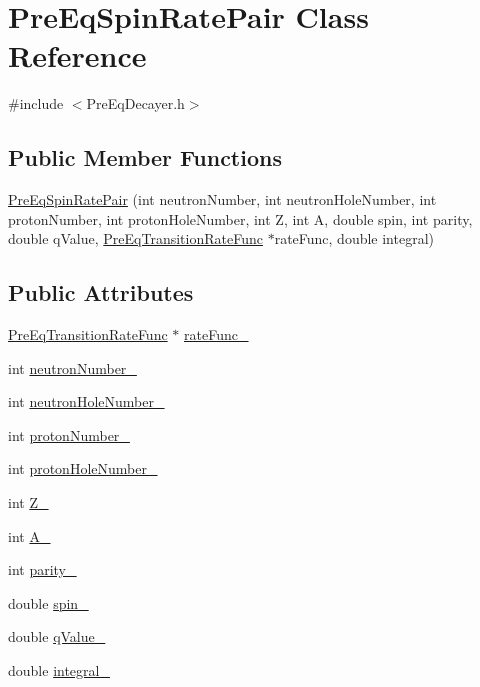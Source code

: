\hypertarget{classPreEqSpinRatePair}{\section{Pre\-Eq\-Spin\-Rate\-Pair Class Reference}
\label{classPreEqSpinRatePair}
}


{\ttfamily \#include $<$Pre\-Eq\-Decayer.\-h$>$}

\subsection*{Public Member Functions}
\begin{DoxyCompactItemize}
\item 
\hyperlink{classPreEqSpinRatePair_a143a6b3e33e768e4f596acbc6a55df3d}{Pre\-Eq\-Spin\-Rate\-Pair} (int neutron\-Number, int neutron\-Hole\-Number, int proton\-Number, int proton\-Hole\-Number, int Z, int A, double spin, int parity, double q\-Value, \hyperlink{classPreEqTransitionRateFunc}{Pre\-Eq\-Transition\-Rate\-Func} $\ast$rate\-Func, double integral)
\end{DoxyCompactItemize}
\subsection*{Public Attributes}
\begin{DoxyCompactItemize}
\item 
\hyperlink{classPreEqTransitionRateFunc}{Pre\-Eq\-Transition\-Rate\-Func} $\ast$ \hyperlink{classPreEqSpinRatePair_aeb84334cfe9778a95c2b45e99dc4eb43}{rate\-Func\-\_\-}
\item 
int \hyperlink{classPreEqSpinRatePair_a9b31793ff9418670b1ce4d1280414a18}{neutron\-Number\-\_\-}
\item 
int \hyperlink{classPreEqSpinRatePair_a3fca737c965ecbe7be4d8222ae3d6af5}{neutron\-Hole\-Number\-\_\-}
\item 
int \hyperlink{classPreEqSpinRatePair_a68a5d5e6475fc408f3617b65b1091e81}{proton\-Number\-\_\-}
\item 
int \hyperlink{classPreEqSpinRatePair_a22dee11a2b4677f2fd589619802adc5b}{proton\-Hole\-Number\-\_\-}
\item 
int \hyperlink{classPreEqSpinRatePair_afd6f7c07bd17e8fbdb7acabd763f2b92}{Z\-\_\-}
\item 
int \hyperlink{classPreEqSpinRatePair_af574e49be0ae28c28ea38c410b925a80}{A\-\_\-}
\item 
int \hyperlink{classPreEqSpinRatePair_a9901f86b3f463069aa0777e788f8292d}{parity\-\_\-}
\item 
double \hyperlink{classPreEqSpinRatePair_af88cd36daa52c5988fb000c0c67e49f9}{spin\-\_\-}
\item 
double \hyperlink{classPreEqSpinRatePair_a96304a72b8a4f972b98ed9149d6708f5}{q\-Value\-\_\-}
\item 
double \hyperlink{classPreEqSpinRatePair_a56396829690f3df1005a6bd025000286}{integral\-\_\-}
\end{DoxyCompactItemize}


